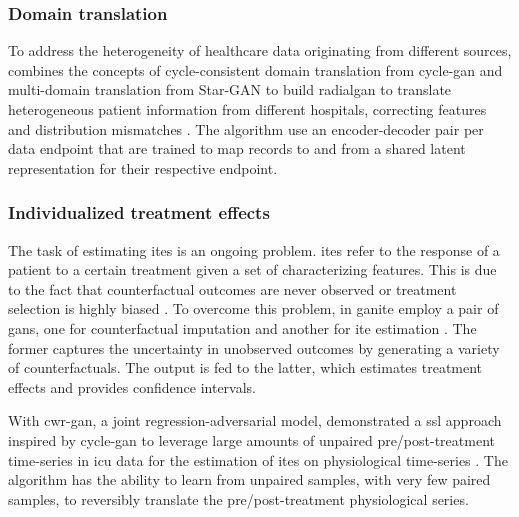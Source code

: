     \subsubsection{Domain translation}
    
        To address the heterogeneity of healthcare data originating from different sources, \citeauthor{Yoon2018-radial} combines the concepts of cycle-consistent domain translation  from \gls{cycle-gan} \cite{Zhu_2017} and  multi-domain translation from Star-GAN \cite{choi2017stargan} to build \gls{radialgan} to translate heterogeneous patient information from different hospitals, correcting features and distribution mismatches \cite{Yoon2018-radial}. The algorithm use an encoder-decoder pair per data endpoint that are trained to map records to and from a shared latent representation for their respective endpoint. 
    
    \subsubsection{Individualized treatment effects}
    
        The task of estimating \glspl{ite} is an ongoing problem. \glspl{ite} refer to the response of a patient to a certain treatment given a set of characterizing features. This is due to the fact that counterfactual outcomes are never observed or treatment selection is highly biased \cite{Yoon2018-ite, mcdermott2018semi, walsh2020generating}. To overcome this problem, in \gls{ganite} \citeauthor{Yoon2018-ite} employ a pair of \glspl{gan}, one for counterfactual imputation and another for \gls{ite} estimation \cite{Yoon2018-ite}. The former captures the uncertainty in unobserved outcomes by generating a variety of counterfactuals. The output is fed to the latter, which estimates treatment effects and provides confidence intervals.\par
    
        With \gls{cwr-gan}, a joint regression-adversarial model, \citeauthor{mcdermott2018semi} demonstrated a \gls{ssl} approach inspired by \gls{cycle-gan} to leverage large amounts of unpaired pre/post-treatment time-series in \gls{icu} data for the estimation of \glspl{ite} on physiological time-series \cite{mcdermott2018semi}. The algorithm has the ability to learn from unpaired samples, with very few paired samples, to reversibly translate the pre/post-treatment physiological series.\par 
    
